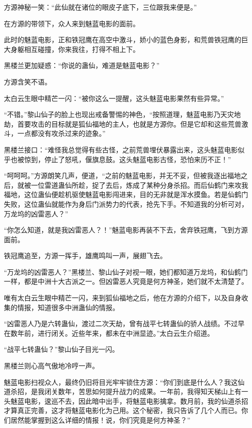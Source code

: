 
\begin{this_body}



方源神秘一笑：“此仙就在诸位的眼皮子底下，三位跟我来便是。”

在方源的带领下，众人来到魅蓝电影的面前。

此时的魅蓝电影，正和铁冠鹰在高空中激斗，娇小的蓝色身影，和荒兽铁冠鹰的巨大身躯相互碰撞，你来我往，打得不相上下。

黑楼兰更加疑惑：“你说的蛊仙，难道是魅蓝电影？”

方源含笑不语。

太白云生眼中精芒一闪：“被你这么一提醒，这头魅蓝电影果然有些异常。”

“不错。”黎山仙子的脸上也现出戒备警惕的神色，“按照道理，魅蓝电影乃天灾地劫，首要攻击的目标就是狐仙福地的主人，也就是方源你。但是它却和这些荒兽激斗，一点都没有攻杀过来的迹象。”

黑楼兰接口：“难怪我总觉得有些古怪，之前荒兽埋伏暴露出来，这头魅蓝电影似乎也被惊到，停止了怒吼，偃旗息鼓。这头魅蓝电影古怪，恐怕来历不正！”

“呵呵呵。”方源朗笑几声，便道，“之前的魅蓝电影，并无不妥，但被我逐出福地之后，就被一位雷道蛊仙所趁，捉了去后，炼成了某种分身杀招。而后仙鹤门来攻我福地，这位蛊仙便趁机驱使魅蓝电影闯进来，目的无非就是浑水摸鱼。若是仙鹤门失败，这位蛊仙就能作为身后门派势力的代表，抢先下手。不知道我的分析可对，万龙坞的凶雷恶人？”

“你怎么知道，就是我凶雷恶人？！”魅蓝电影再装不下去，舍弃铁冠鹰，飞到方源面前。

铁冠鹰追至，方源一挥手，雄鹰鸣叫一声，展翅飞去。

“万龙坞的凶雷恶人？”黑楼兰、黎山仙子对视一眼，她们都知道万龙坞，和仙鹤门一样，都是中洲十大古派之一。但凶雷恶人究竟是何方神圣，她们就不太清楚了。

唯有太白云生眼中精芒一闪，来到狐仙福地之后，他在方源的介绍下，以及自身收集的情报，知道很多中洲蛊仙的情报。

“凶雷恶人乃是六转蛊仙，渡过二次天劫，曾有战平七转蛊仙的骄人战绩。不过早在数年前，进行闭关。近些年来，都未在中洲显迹。”太白云生介绍道。

“战平七转蛊仙？”黎山仙子目光一闪。

黑楼兰则心高气傲地冷哼一声。

魅蓝电影扫视众人，最终仍旧将目光牢牢锁住方源：“你们到底是什么人？我这仙道杀招，是我闭关数年，苦思如何提升战力的成果。一年前，我得知天梯山上有一头魅蓝电影，逡巡不去，因此暗中出手，将魅蓝电影擒拿。数月前，我的仙道杀招才算真正完善，这才将魅蓝电影化为己用。这个秘密，我只告诉了几个人而已。你们居然能掌握到这么详细的情报！说，你们究竟是何方神圣？”


\end{this_body}
